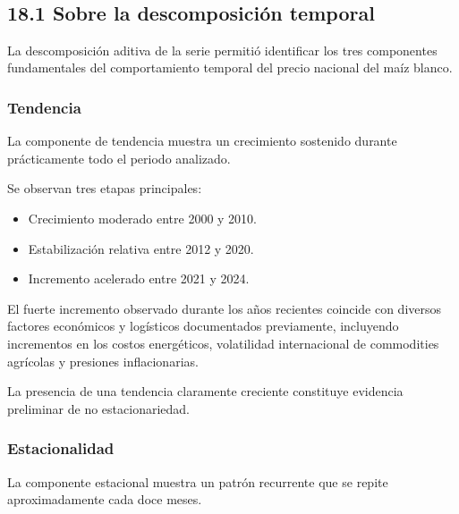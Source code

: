 \documentclass[11pt]{article}
\providecommand{\tightlist}{%
      \setlength{\itemsep}{0pt}\setlength{\parskip}{0pt}}
\begin{document}
    \begin{center}
    \end{center}
    { \hspace*{\fill} \\}
    
    \hypertarget{sobre-la-descomposiciuxf3n-temporal}{%
\subsection{18.1 Sobre la descomposición
temporal}\label{sobre-la-descomposiciuxf3n-temporal}}

La descomposición aditiva de la serie permitió identificar los tres
componentes fundamentales del comportamiento temporal del precio
nacional del maíz blanco.

\hypertarget{tendencia}{%
\subsubsection{Tendencia}\label{tendencia}}

La componente de tendencia muestra un crecimiento sostenido durante
prácticamente todo el periodo analizado.

Se observan tres etapas principales:

\begin{itemize}
\tightlist
\item
  Crecimiento moderado entre 2000 y 2010.
\item
  Estabilización relativa entre 2012 y 2020.
\item
  Incremento acelerado entre 2021 y 2024.
\end{itemize}

El fuerte incremento observado durante los años recientes coincide con
diversos factores económicos y logísticos documentados previamente,
incluyendo incrementos en los costos energéticos, volatilidad
internacional de commodities agrícolas y presiones inflacionarias.

La presencia de una tendencia claramente creciente constituye evidencia
preliminar de no estacionariedad.

\hypertarget{estacionalidad}{%
\subsubsection{Estacionalidad}\label{estacionalidad}}

La componente estacional muestra un patrón recurrente que se repite
aproximadamente cada doce meses.
\end{document}
